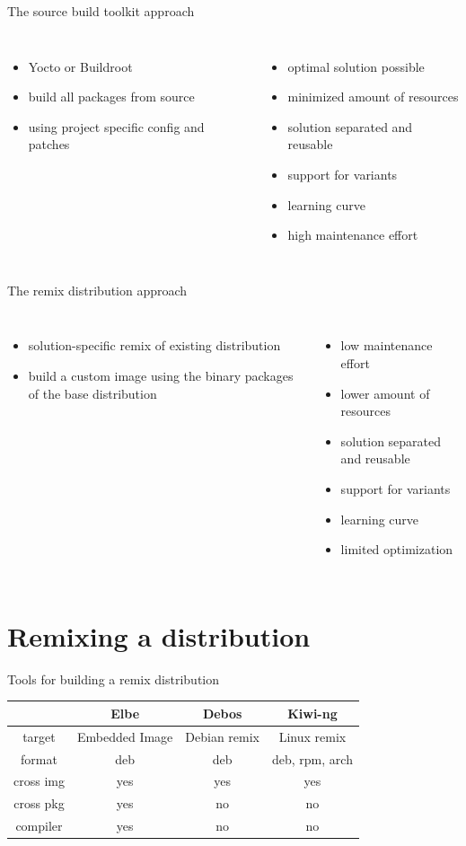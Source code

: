 \documentclass{beamer}
\newcommand\pro{\item[$+$]}
\newcommand\con{\item[$-$]}
\begin{document}
\begin{frame}{The source build toolkit approach}
	\begin{columns}
        \centering
        \begin{itemize}
        		\item Yocto or Buildroot
        		\item build all packages from source
        		\item using project specific config and patches
        \end{itemize}
        \centering
        \begin{itemize}
        		\pro optimal solution possible
        		\pro minimized amount of resources
        		\pro solution separated and reusable
        		\pro support for variants
        		\con learning curve
        		\con high maintenance effort
        \end{itemize}
    \end{columns}
\end{frame}

\begin{frame}{The remix distribution approach}
	\begin{columns}
		\centering
		\begin{itemize}
			\item solution-specific remix of existing distribution
			\item build a custom image using the binary packages of the base distribution
		\end{itemize}
		\centering
		\begin{itemize}
			\pro low maintenance effort
			\pro lower amount of resources
			\pro solution separated and reusable
			\pro support for variants
			\con learning curve
			\con limited optimization
		\end{itemize}
	\end{columns}
\end{frame}

\section{Remixing a distribution}

\begin{frame}{Tools for building a remix distribution}
	\begin{tabular}{c|ccc}
		& \textbf{Elbe} & \textbf{Debos} & \textbf{Kiwi-ng} \\
		\hline
		target & Embedded Image & Debian remix & Linux remix \\ 
		format & deb & deb & deb, rpm, arch \\
		cross img & yes & yes & yes \\
		cross pkg & yes & no & no \\
		compiler & yes & no & no \\
	\end{tabular}
\end{frame}
\end{document}
